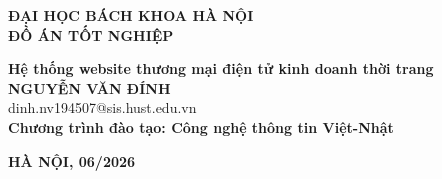 \documentclass[DoAn.tex]{subfiles}
\begin{document}
\begin{titlepage}
\thispagestyle{empty}
\begin{center}

{\textbf{\large{ĐẠI HỌC BÁCH KHOA HÀ NỘI}}}\\[2cm]

{\textbf{\huge{ ĐỒ ÁN TỐT NGHIỆP}}}\\[1cm]
{\textbf{\Large{Hệ thống website thương mại điện tử kinh doanh thời trang}}\\[1cm]

{\textbf{\large{NGUYỄN VĂN ĐÍNH}}}\\
{\large{dinh.nv194507@sis.hust.edu.vn}}\\[0.5cm]

{\textbf{\large{Chương trình đào tạo: Công nghệ thông tin Việt-Nhật
}}}\\

\vspace{2cm}
\begin{table}[H]
\centering
{}
\end{table}}
\end{center}

\vfill
\begin{center}
\textbf{HÀ NỘI, 06/2026}
\end{center}

\end{titlepage}
\end{document}
